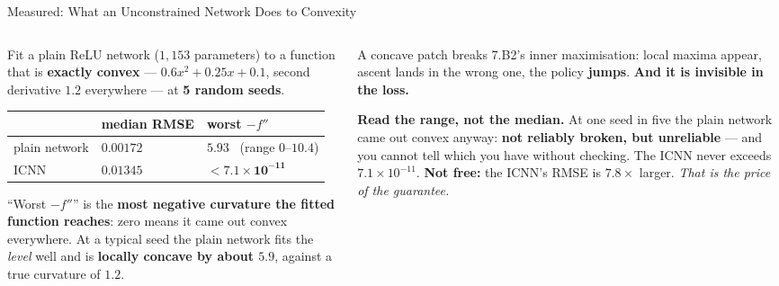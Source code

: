 \begin{frame}{Measured: What an Unconstrained Network Does to Convexity}
\begin{columns}[T]
\begin{column}{0.52\textwidth}
\small
Fit a plain ReLU network ($1{,}153$ parameters) to a function that is \textbf{exactly convex} --- $0.6x^{2}+0.25x+0.1$, second derivative $1.2$ everywhere --- at \textbf{5 random seeds}.
\smallskip

\begin{center}\footnotesize
\begin{tabularx}{\linewidth}{@{}>{\raggedright\arraybackslash}X >{\raggedleft\arraybackslash}p{1.9cm} >{\raggedleft\arraybackslash}p{2.6cm}@{}}
\toprule
& \textbf{median RMSE} & \textbf{worst $-f''$} \\
\midrule
plain network & $\mathbf{0.00172}$ & $5.93$ \ \tiny(range $0$--$10.4$) \\
ICNN & $0.01345$ & $\mathbf{<7.1\times10^{-11}}$ \\
\bottomrule
\end{tabularx}
\end{center}
\smallskip
``Worst $-f''$'' is the \textbf{most negative curvature the fitted function reaches}: zero means it came out convex everywhere. At a typical seed the plain network fits the \emph{level} well and is \textbf{locally concave by about $5.9$}, against a true curvature of $1.2$.
\end{column}
\begin{column}{0.45\textwidth}
\begin{cautionbox}[title=\textbf{Fatal, not untidy}]\small
A concave patch breaks 7.B2's inner maximisation: local maxima appear, ascent lands in the wrong one, the policy \textbf{jumps}. \textbf{And it is invisible in the loss.}
\end{cautionbox}
\smallskip
\begin{takeawaybox}\footnotesize
\textbf{Read the range, not the median.} At one seed in five the plain network came out convex anyway: \textbf{not reliably broken, but unreliable} --- and you cannot tell which you have without checking. The ICNN never exceeds $7.1\times10^{-11}$.
\smallskip
\textbf{Not free:} the ICNN's RMSE is $\mathbf{7.8\times}$ larger. \emph{That is the price of the guarantee.}
\end{takeawaybox}
\end{column}
\end{columns}
\vspace{1mm}
\end{frame}

